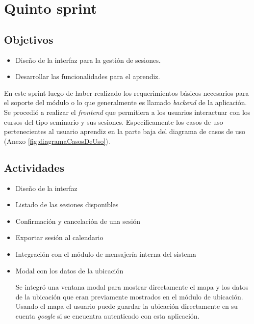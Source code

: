 \section{Quinto sprint} %
\label{sec:quinto_sprint}

\subsection{Objetivos}

\begin{itemize}
	\item Diseño de la interfaz para la gestión de sesiones.
	\item Desarrollar las funcionalidades para el aprendiz.
\end{itemize}

En este sprint luego de haber realizado los requerimientos básicos necesarios para el soporte del módulo o lo que generalmente es llamado \emph{backend} de la aplicación. Se procedió a realizar el \emph{frontend} que permitiera a los usuarios interactuar con los cursos del tipo seminario y sus sesiones. Específicamente los casos de uso pertenecientes al usuario aprendiz en la parte baja del diagrama de casos de uso (Anexo \ref{fig:diagramaCasosDeUso}).

\subsection{Actividades} %
\label{sub:actividades5}

\begin{itemize}

\item Diseño de la interfaz
\item Listado de las sesiones disponibles
\item Confirmación y cancelación de una sesión
\item Exportar sesión al calendario
\item Integración con el módulo de mensajería interna del sistema
\item Modal con los datos de la ubicación

	Se integró una ventana modal para mostrar directamente el mapa y los datos de la ubicación que eran previamente mostrados en el módulo de ubicación. Usando el mapa el usuario puede guardar la ubicación directamente en su cuenta \emph{google} si se encuentra autenticado con esta aplicación.

\end{itemize}



